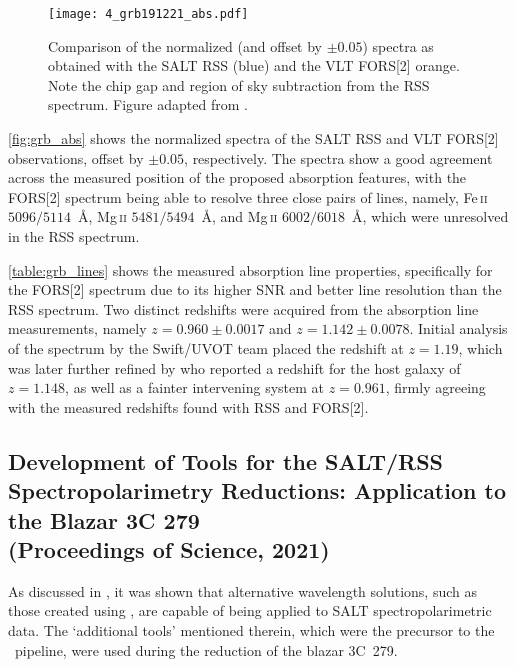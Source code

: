 \begin{figure}[t]
    \centering
    \texttt{[image: 4\_grb191221\_abs.pdf]}
    \caption{Comparison of the normalized (and offset by $\pm 0.05$) spectra as obtained with the \gls{SALT} \gls{RSS} (blue) and the \gls{VLT} \gls{FORS}[2] orange. Note the chip gap and region of sky subtraction from the \gls{RSS} spectrum. Figure adapted from \citep{Buckley191221B}.}
    \label{fig:grb_abs}
\end{figure}

\autoref{fig:grb_abs} shows the normalized spectra of the \gls{SALT} \gls{RSS} and \gls{VLT} \gls{FORS}[2] observations, offset by $\pm 0.05$, respectively.
The spectra show a good agreement across the measured position of the proposed absorption features, with the \gls{FORS}[2] spectrum being able to resolve three close pairs of lines, namely, {Fe}\,\textsc{ii} $5096/5114$~\AA, {Mg}\,\textsc{ii} $5481/5494$~\AA, and {Mg}\,\textsc{ii} $6002/6018$~\AA, which were unresolved in the \gls{RSS} spectrum.



\autoref{table:grb_lines} shows the measured absorption line properties, specifically for the \gls{FORS}[2] spectrum due to its higher \gls{SNR} and better line resolution than the \gls{RSS} spectrum.
Two distinct redshifts were acquired from the absorption line measurements, namely $z = 0.960 \pm 0.0017$ and $z = 1.142 \pm 0.0078$.
Initial analysis of the spectrum by the \gls{Swift}/\gls{UVOT} team \citep{Kuin2019} placed the redshift at $z = 1.19$, which was later further refined by \citet{Vielfaure2019} who reported a redshift for the host galaxy of $z = 1.148$, as well as a fainter intervening system at $z = 0.961$, firmly agreeing with the measured redshifts found with \gls{RSS} and \gls{FORS}[2].

\subsection[Proceeding, HEASA (2021)]{%
    Development of Tools for the \gls{SALT}/\gls{RSS} Spectro\-polari\-metry Reductions: Application to the Blazar 3C 279\\
    (Proceedings of Science,  2021)
}

As discussed in \citet[][see also \autoref{app:papers}]{Cooper_HEASA2021}, it was shown that alternative wavelength solutions, such as those created using \iraf, are capable of being applied to \gls{SALT} spectro\-polarimetric data.
The `additional tools' mentioned therein, which were the precursor to the \stops\ pipeline, were used during the reduction of the blazar 3C~279.

